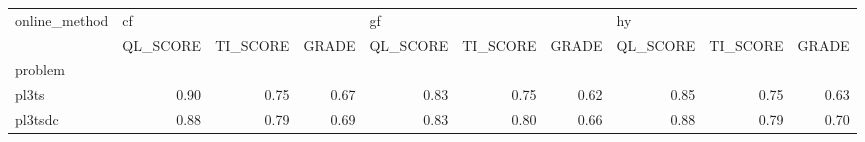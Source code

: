\begin{tabular}{lrrrrrrrrr}
\toprule
online\_method & \multicolumn{3}{l}{cf} & \multicolumn{3}{l}{gf} & \multicolumn{3}{l}{hy} \\
{} & QL\_SCORE & TI\_SCORE & GRADE & QL\_SCORE & TI\_SCORE & GRADE & QL\_SCORE & TI\_SCORE & GRADE \\
problem &          &          &       &          &          &       &          &          &       \\
\midrule
pl3ts   &     0.90 &     0.75 &  0.67 &     0.83 &     0.75 &  0.62 &     0.85 &     0.75 &  0.63 \\
pl3tsdc &     0.88 &     0.79 &  0.69 &     0.83 &     0.80 &  0.66 &     0.88 &     0.79 &  0.70 \\
\bottomrule
\end{tabular}
